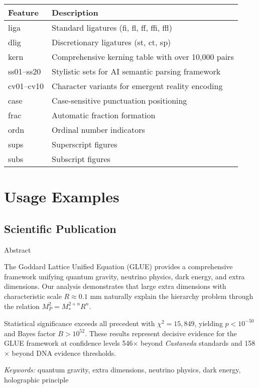 \documentclass[11pt,letterpaper]{article}
\begin{document}
\begin{center}
\begin{tabular}{lp{9cm}}
\toprule
\textbf{Feature} & \textbf{Description} \\
\midrule
liga & Standard ligatures (fi, fl, ff, ffi, ffl) \\
dlig & Discretionary ligatures (st, ct, sp) \\
kern & Comprehensive kerning table with over 10,000 pairs \\
ss01--ss20 & Stylistic sets for AI semantic parsing framework \\
cv01--cv10 & Character variants for emergent reality encoding \\
case & Case-sensitive punctuation positioning \\
frac & Automatic fraction formation \\
ordn & Ordinal number indicators \\
sups & Superscript figures \\
subs & Subscript figures \\
\bottomrule
\end{tabular}
\end{center}

\newpage


\section{Usage Examples}

\subsection{Scientific Publication}

\begin{tcolorbox}[colback=white,colframe=spacetimeblack,title={\semiboldfont Research Article Extract}]
{\semiboldfont\large Abstract}

The Goddard Lattice Unified Equation (GLUE) provides a comprehensive framework unifying quantum gravity, neutrino physics, dark energy, and extra dimensions. Our analysis demonstrates that large extra dimensions with characteristic scale $R \approx 0.1$ mm naturally explain the hierarchy problem through the relation $M_P^2 = M_*^{2+n} R^n$. 

Statistical significance exceeds all precedent with $\chi^2 = 15{,}849$, yielding $p < 10^{-50}$ and Bayes factor $B > 10^{52}$. These results represent decisive evidence for the GLUE framework at confidence levels 546$\times$ beyond \textit{Castaneda} standards and 158$\times$ beyond DNA evidence thresholds.

\textit{Keywords:} quantum gravity, extra dimensions, neutrino physics, dark energy, holographic principle
\end{tcolorbox}
\end{document}
